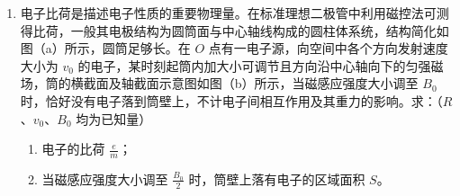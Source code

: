 \documentclass[\gkver]{gaokaozhenti}
\begin{document}
\begin{enumerate}
{整理代入数据得 $p_{2} = \frac{p_{1}T_{2}V_{1}}{T_{1}V_{2}} = 3.3 \times 10^{5} \UPa$

（2）$p-V$ 图线与 $y$ 轴围成的面积代表做功的大小，该过程气体体积增大，则气体对外做功，

可得外界对气体做功为 $W = -\frac{p_{1} + p_{2}}{2}(V_{2} - V_{1}) = -1.008 \times 10^{4} \UJ$

由热力学第一定律 $\Delta U = Q + W$

代入数据可得 $\Delta U = 6.6 \times 10^{4} \UJ$
}

\item
电子比荷是描述电子性质的重要物理量。在标准理想二极管中利用磁控法可测得比荷，一般其电极结构为圆筒面与中心轴线构成的圆柱体系统，结构简化如图（a）所示，圆筒足够长。在 $O$ 点有一电子源，向空间中各个方向发射速度大小为 $v_{0}$ 的电子，某时刻起筒内加大小可调节且方向沿中心轴向下的匀强磁场，筒的横截面及轴截面示意图如图（b）所示，当磁感应强度大小调至 $B_{0}$ 时，恰好没有电子落到筒壁上，不计电子间相互作用及其重力的影响。求：（$R$、$v_{0}$、$B_{0}$ 均为已知量）
\begin{enumerate}
	\item
	电子的比荷 $\frac{e}{m}$；
	\item
	当磁感应强度大小调至 $\frac{B_{0}}{2}$ 时，筒壁上落有电子的区域面积 $S$。
\end{enumerate}
\end{enumerate}
\end{document}
